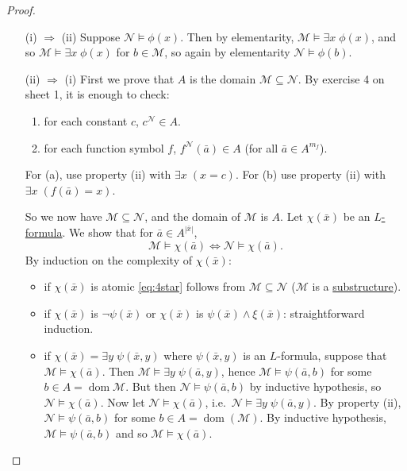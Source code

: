 \documentclass{article}
\let\models\vDash
\DeclareMathOperator{\dom}{dom}
\begin{document}
\begin{proof}\leavevmode
  \begin{itemize}
    \item [(i) $\Rightarrow$ (ii)] Suppose $\mathcal{N} \models \phi(x)$.
      Then by elementarity, $\mathcal{M} \models \exists x \; \phi(x)$, and so $\mathcal{M} \models \exists x \; \phi(x)$ for $b \in \mathcal{M}$, so again by elementarity $\mathcal{N} \models \phi(b)$.
    \item [(ii) $\Rightarrow$ (i)] First we prove that $A$ is the domain $\mathcal{M} \subseteq \mathcal{N}$.
      By exercise 4 on sheet 1, it is enough to check:
      \begin{enumerate}[label=(\alph*)]
        \item for each constant $c$, $c^\mathcal{N} \in A$.
        \item for each function symbol $f$, $f^{\mathcal{N}}(\bar{a}) \in A$ (for all $\bar{a} \in A^{m_f}$).
      \end{enumerate}
      For (a), use property (ii) with $\exists x\; (x = c)$. For (b) use property (ii) with $\exists x\; (f(\bar{a}) = x)$.

      So we now have $\mathcal{M} \subseteq \mathcal{N}$, and the domain of $\mathcal{M}$ is $A$.
      Let $\chi(\bar{x})$ be an \hyperlink{def:form}{$L$-formula}.
      We show that for $\bar{a} \in A^{|\bar{x}|}$,
      \begin{equation*}
        \mathcal{M} \models \chi(\bar{a}) \iff \mathcal{N} \models \chi(\bar{a}). \tag{$*$} \label{eq:4star}
      \end{equation*}
      By induction on the complexity of $\chi(\bar{x})$:
      \begin{itemize}[label=--]
        \item if $\chi(\bar{x})$ is atomic \eqref{eq:4star} follows from $\mathcal{M} \subseteq \mathcal{N}$ ($\mathcal{M}$ is a \hyperlink{def:subs}{substructure}).
        \item if $\chi(\bar{x})$ is $\neg \psi(\bar{x})$ or $\chi(\bar{x})$ is $\psi(\bar{x}) \wedge \xi(\bar{x})$: straightforward induction.
        \item if $\chi(\bar{x}) = \exists y \; \psi(\bar{x},y)$ where $\psi(\bar{x},y)$ is an $L$-formula, suppose that $\mathcal{M} \models \chi(\bar{a})$.
          Then $\mathcal{M} \models \exists y \; \psi(\bar{a}, y)$, hence $\mathcal{M} \models \psi(\bar{a},b)$ for some $b \in A = \dom \mathcal{M}$.
          But then $\mathcal{N} \models \psi(\bar{a},b)$ by inductive hypothesis, so $\mathcal{N} \models \chi(\bar{a})$.
          Now let $\mathcal{N} \models \chi(\bar{a})$, i.e.\ $\mathcal{N} \models \exists y \; \psi(\bar{a},y)$.
          By property (ii), $\mathcal{N} \models \psi(\bar{a},b)$ for some $b \in A = \dom(\mathcal{M})$.
          By inductive hypothesis, $\mathcal{M} \models \psi(\bar{a},b)$ and so $\mathcal{M} \models \chi(\bar{a})$. \qedhere
      \end{itemize}
  \end{itemize}
\end{proof}
\end{document}
